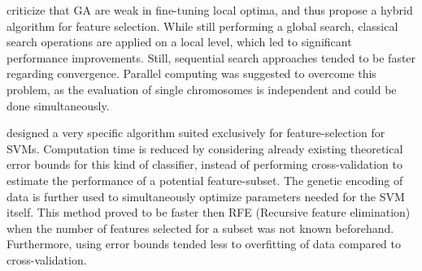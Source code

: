 \cite{Oh:04} criticize that GA are weak in fine-tuning local optima, and thus propose a hybrid algorithm for feature selection. While still performing a 
global search, classical search operations are applied on a local level, which led to significant performance improvements. Still, sequential search approaches
tended to be faster regarding convergence. Parallel computing was suggested to overcome this problem, as the evaluation of single chromosomes is independent 
and could be done simultaneously.

\cite{Frohlich:03} designed a very specific algorithm suited exclusively for feature-selection for SVMs. Computation time is reduced by considering already
existing theoretical error bounds for this kind of classifier, instead of performing cross-validation to estimate the performance
of a potential feature-subset. The genetic encoding of data is further used to simultaneously optimize parameters needed for the SVM itself.
This method proved to be faster then RFE (Recursive feature elimination) when the number of features selected for a subset was not known beforehand.
Furthermore, using error bounds tended less to overfitting of data compared to cross-validation.